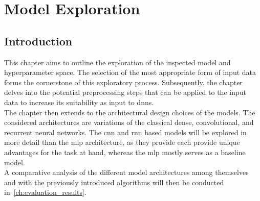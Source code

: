 \chapter{Model Exploration}
\label{ch:model_exploration}

\section{Introduction}

This chapter aims to outline the exploration of the inspected model and hyperparameter space.
The selection of the most appropriate form of input data forms the cornerstone of this exploratory process.
Subsequently, the chapter delves into the potential preprocessing steps that can be applied to the input data to increase
its suitability as input to \glspl{dnn}.\\
The chapter then extends to the architectural design choices of the models. The considered architectures are
variations of the classical dense, convolutional, and recurrent neural networks.
The \gls{cnn} and \gls{rnn} based models will be explored in more detail than the \gls{mlp} architecture, as they provide
each provide unique advantages for the task at hand, whereas the \gls{mlp} mostly serves as a baseline model.\\
A comparative analysis of the different model architectures among themselves and with the previously introduced algorithms
will then be conducted in~\autoref{ch:evaluation_results}.









